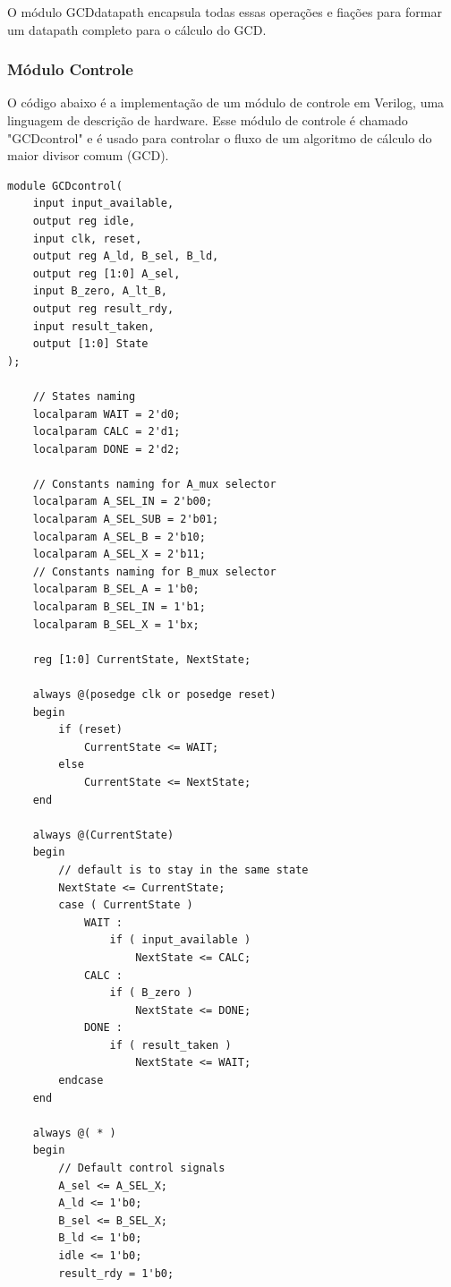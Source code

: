 \documentclass[a4paper,11pt]{article} %
\begin{document}
O módulo GCDdatapath encapsula todas essas operações e fiações para formar um datapath completo para o cálculo do GCD.


\subsubsection{Módulo Controle}

O código abaixo é a implementação de um módulo de controle em Verilog, 
uma linguagem de descrição de hardware. 
Esse módulo de controle é chamado "GCDcontrol" e é usado para 
controlar o fluxo de um algoritmo de cálculo do maior divisor comum (GCD).

\begin{verbatim}
module GCDcontrol(
    input input_available,
    output reg idle,
    input clk, reset,
    output reg A_ld, B_sel, B_ld,
    output reg [1:0] A_sel,
    input B_zero, A_lt_B,
    output reg result_rdy,
    input result_taken,
    output [1:0] State
);

    // States naming
    localparam WAIT = 2'd0;
    localparam CALC = 2'd1;
    localparam DONE = 2'd2;

    // Constants naming for A_mux selector
    localparam A_SEL_IN = 2'b00;
    localparam A_SEL_SUB = 2'b01;
    localparam A_SEL_B = 2'b10;
    localparam A_SEL_X = 2'b11;
    // Constants naming for B_mux selector
    localparam B_SEL_A = 1'b0;
    localparam B_SEL_IN = 1'b1;
    localparam B_SEL_X = 1'bx;

    reg [1:0] CurrentState, NextState;

    always @(posedge clk or posedge reset)  
    begin 
        if (reset) 
            CurrentState <= WAIT;
        else 
            CurrentState <= NextState; 
    end 

    always @(CurrentState)
    begin
        // default is to stay in the same state
        NextState <= CurrentState;
        case ( CurrentState )
            WAIT :
                if ( input_available )
                    NextState <= CALC;
            CALC :
                if ( B_zero )
                    NextState <= DONE;
            DONE :
                if ( result_taken )
                    NextState <= WAIT;
        endcase
    end 

    always @( * )
    begin
        // Default control signals
        A_sel <= A_SEL_X;
        A_ld <= 1'b0;
        B_sel <= B_SEL_X;
        B_ld <= 1'b0;
        idle <= 1'b0; 
        result_rdy = 1'b0;


\end{verbatim}
\end{document}
